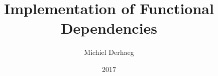 \documentclass[]{article}
\author{Michiel Derhaeg}
\title{Implementation of Functional Dependencies}
\date{2017}
\begin{document}
\maketitle
\tableofcontents















%

{}

\end{document}
